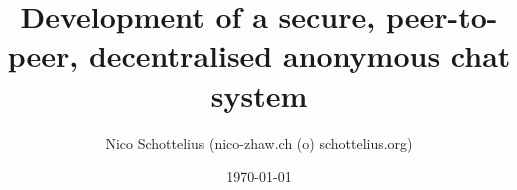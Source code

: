 \documentclass[12pt,a4paper]{report}
\begin{document}
\title{Development of a secure, peer-to-peer, decentralised anonymous chat system}
\date{\today}
\author{Nico Schottelius (nico-zhaw.ch (o) schottelius.org)}
\maketitle
\newpage
\tableofcontents
\listoftables
\listoffigures
\newpage

















\appendix

\end{document}
